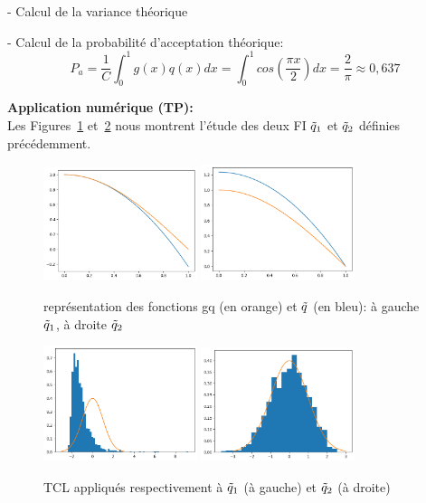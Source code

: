 \documentclass{article}
\begin{document}
- Calcul de la variance théorique


- Calcul de la probabilité d'acceptation théorique:
$$P_a = \frac1C \int_0^1 g(x)q(x)dx 
= \int_0^1 cos(\frac{\pi x}{2})dx 
=\frac{2}{\pi} 
\approx 0,637$$

\textbf{Application numérique (TP):}\\
Les Figures~\ref{TP1_IS_DL} et~\ref{TP1_IS_TCL} nous montrent l'étude des deux FI $\Tilde{q}_1$ et $\Tilde{q}_2$ définies précédemment.

\begin{figure}[ht]
\centering
\includegraphics[width=0.4\textwidth]{TP1/DL_ordre2_g.png}
\includegraphics[width=0.4\textwidth]{TP1/DL_ordre2_corrige.png}
\caption{représentation des fonctions gq (en orange) et $\Tilde{q}$ (en bleu): à gauche $\Tilde{q}_1$, à droite $\Tilde{q}_2$}
\label{TP1_IS_DL}
\end{figure}

\begin{figure}[ht]
\centering
\includegraphics[width=0.4\textwidth]{TP1/IS_TCL_DL_ordre2.png}
\includegraphics[width=0.4\textwidth]{TP1/IS_TCL_DL_ordre2_corrige.png}
\caption{TCL appliqués respectivement à $\Tilde{q}_1$ (à gauche) et $\Tilde{q}_2$ (à droite)}
\label{TP1_IS_TCL}
\end{figure}
\end{document}
